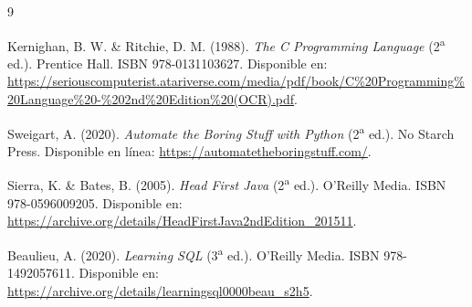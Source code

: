 \documentclass[11pt,letterpaper]{article}
\begin{document}
\newpage
\begin{thebibliography}{9}

Kernighan, B. W. \& Ritchie, D. M. (1988).
\textit{The C Programming Language} (2\textsuperscript{a} ed.).
Prentice Hall. ISBN 978-0131103627. Disponible en:
\url{https://seriouscomputerist.atariverse.com/media/pdf/book/C\%20Programming\%20Language\%20-\%202nd\%20Edition\%20(OCR).pdf}.

Sweigart, A. (2020).
\textit{Automate the Boring Stuff with Python} (2\textsuperscript{a} ed.).
No Starch Press. Disponible en línea:
\url{https://automatetheboringstuff.com/}.

Sierra, K. \& Bates, B. (2005).
\textit{Head First Java} (2\textsuperscript{a} ed.).
O'Reilly Media. ISBN 978-0596009205. Disponible en:
\url{https://archive.org/details/HeadFirstJava2ndEdition_201511}.

Beaulieu, A. (2020).
\textit{Learning SQL} (3\textsuperscript{a} ed.).
O'Reilly Media. ISBN 978-1492057611. Disponible en:
\url{https://archive.org/details/learningsql0000beau_s2h5}.

\end{thebibliography}
\end{document}
